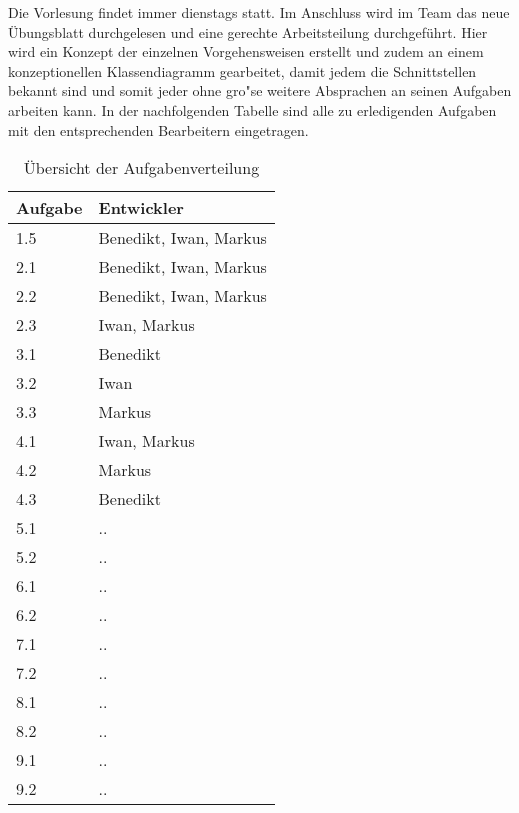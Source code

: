 Die Vorlesung findet immer dienstags statt.
Im Anschluss wird im Team das neue \"Ubungsblatt durchgelesen und eine gerechte Arbeitsteilung durchgef\"uhrt.
Hier wird ein Konzept der einzelnen Vorgehensweisen erstellt und zudem an einem konzeptionellen Klassendiagramm gearbeitet, damit jedem die Schnittstellen bekannt sind und somit jeder ohne gro"se weitere Absprachen an seinen Aufgaben arbeiten kann.
In der nachfolgenden Tabelle sind alle zu erledigenden Aufgaben mit den entsprechenden Bearbeitern eingetragen.


\vspace{1em}
\begin{table}[!h]
    \centering
    \begin{tabular}{|l|l|}
        \hline
        \textbf{Aufgabe} & \textbf{Entwickler} \\
        \hline
        1.5 & Benedikt, Iwan, Markus \\
        \hline
        2.1 & Benedikt, Iwan, Markus \\
        \hline
        2.2 & Benedikt, Iwan, Markus \\
        \hline
        2.3 & Iwan, Markus \\
        \hline
        3.1 & Benedikt \\
        \hline
        3.2 & Iwan \\
        \hline
        3.3 & Markus \\
        \hline
        4.1 & Iwan, Markus \\
        \hline
        4.2 & Markus \\
        \hline
        4.3 & Benedikt \\
        \hline
        5.1 & .. \\
        \hline
        5.2 & .. \\
        \hline
        6.1 & .. \\
        \hline
        6.2 & .. \\
        \hline
        7.1 & .. \\
        \hline
        7.2 & .. \\
        \hline
        8.1 & .. \\
        \hline
        8.2 & .. \\
        \hline
        9.1 & .. \\
        \hline
        9.2 & .. \\
        \hline
    \end{tabular}
    \caption{Übersicht der Aufgabenverteilung}
    \label{tab:arbeitsverteilung}
\end{table}


